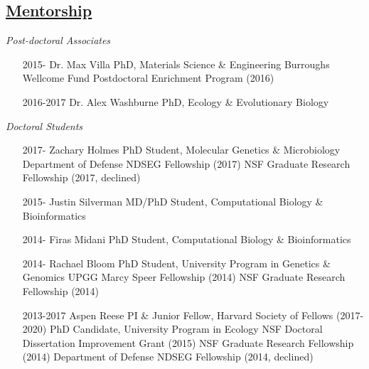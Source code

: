 \documentclass[overlapped,line,11pt]{res}
\begin{document}
\begin{resume}
\section{\underline{\sc Mentorship}}
\vspace{.1in}

\emph{Post-doctoral Associates}
\vspace{.1in}

\begin{itemize}[leftmargin=2cm, style=sameline, itemsep=0mm]

\item[2015-] Dr. Max Villa \newline 
  PhD, Materials Science \& Engineering \newline
  Burroughs Wellcome Fund Postdoctoral Enrichment Program (2016)
\item[2016-2017] Dr. Alex Washburne \newline 
  PhD, Ecology \& Evolutionary Biology 
  
  
\end{itemize}

\vspace{-.1in}
\emph{Doctoral Students}
\vspace{.1in}

\begin{itemize}[leftmargin=2cm, style=sameline, itemsep=0mm]

\item[2017-] Zachary Holmes \newline 
  PhD Student, Molecular Genetics \& Microbiology \newline
  Department of Defense NDSEG Fellowship (2017) \newline
  NSF Graduate Research Fellowship (2017, declined)
\item[2015-] Justin Silverman \newline 
  MD/PhD Student, Computational Biology \& Bioinformatics
\item[2014-] Firas Midani \newline 
  PhD Student, Computational Biology \& Bioinformatics
\item[2014-] Rachael Bloom \newline 
  PhD Student, University Program in Genetics \& Genomics \newline
  UPGG Marcy Speer Fellowship (2014) \newline
  NSF Graduate Research Fellowship (2014)
\item[2013-2017] Aspen Reese \newline 
  PI \& Junior Fellow, Harvard Society of Fellows (2017-2020)\newline
  PhD Candidate, University Program in Ecology \newline
  NSF Doctoral Dissertation Improvement Grant (2015) \newline
  NSF Graduate Research Fellowship (2014) \newline
  Department of Defense NDSEG Fellowship (2014, declined)
\end{itemize}


\end{resume}
\end{document}
